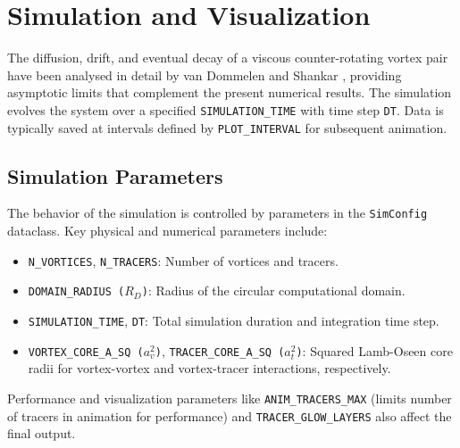 \documentclass[12pt,letterpaper]{article}
\newcommand{\domainradius}{R_D}
\newcommand{\corevsq}{a_v^2}
\newcommand{\coretsq}{a_t^2}
\begin{document}
\section{Simulation and Visualization}
The diffusion, drift, and eventual decay of a viscous counter-rotating vortex pair have been analysed in detail by van Dommelen and Shankar \cite{VanDommelen1995}, providing asymptotic limits that complement the present numerical results.
The simulation evolves the system over a specified \texttt{SIMULATION\_TIME} with time step \texttt{DT}. Data is typically saved at intervals defined by \texttt{PLOT\_INTERVAL} for subsequent animation.

\subsection{Simulation Parameters}
The behavior of the simulation is controlled by parameters in the \texttt{SimConfig} dataclass. Key physical and numerical parameters include:
\begin{itemize}[nosep]
    \item \texttt{N\_VORTICES}, \texttt{N\_TRACERS}: Number of vortices and tracers.
    \item \texttt{DOMAIN\_RADIUS ($\domainradius$)}: Radius of the circular computational domain.
    \item \texttt{SIMULATION\_TIME}, \texttt{DT}: Total simulation duration and integration time step.
    \item \texttt{VORTEX\_CORE\_A\_SQ ($\corevsq$)}, \texttt{TRACER\_CORE\_A\_SQ ($\coretsq$)}: Squared Lamb-Oseen core radii for vortex-vortex and vortex-tracer interactions, respectively.
\end{itemize}
Performance and visualization parameters like \texttt{ANIM\_TRACERS\_MAX} (limits number of tracers in animation for performance) and \texttt{TRACER\_GLOW\_LAYERS} also affect the final output.
\end{document}
